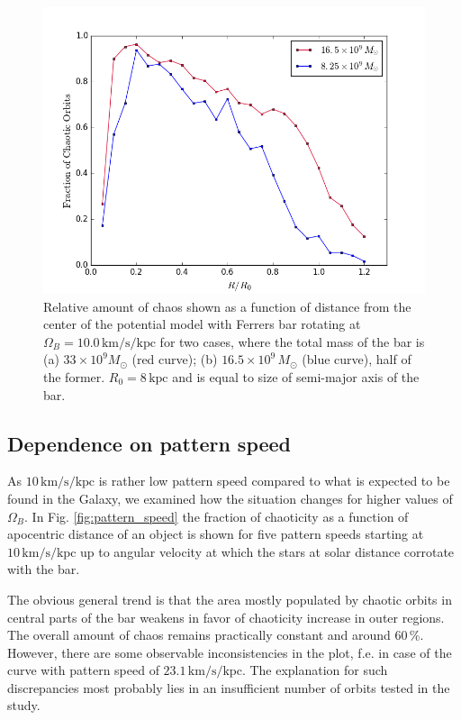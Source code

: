 \documentclass[a4paper,fleqn,usenatbib]{mnras}
\begin{document}
\begin{figure}
	\includegraphics[width=\columnwidth]{mass_dep}
	\caption{Relative amount of chaos shown as a function of distance from the center of the potential model with Ferrers bar rotating at $ \Omega_B = 10.0\,\mathrm{km/s/kpc} $ for two cases, where the total mass of the bar is (a) $ 33 \times 10^9 M_{\odot}$ (red curve); (b) $ 16.5 \times 10^9\,M_{\odot}$ (blue curve), half of the former. $ R_0 = 8\,\mathrm{kpc} $ and is equal to size of semi-major axis of the bar.}
	\label{fig:total_mass}
\end{figure}

\subsection{Dependence on pattern speed}
As $ 10\,\mathrm{km/s/kpc} $ is rather low pattern speed compared to what is expected to be found in the Galaxy, we examined how the situation changes for higher values of $ \Omega_B $. In Fig. \ref{fig:pattern_speed} the fraction of chaoticity as a function of apocentric distance of an object is shown for five pattern speeds starting at $ 10\,\mathrm{km/s/kpc} $ up to angular velocity at which the stars at solar distance corrotate with the bar.

The obvious general trend is that the area mostly populated by chaotic orbits in central parts of the bar weakens in favor of chaoticity increase in outer regions. The overall amount of chaos remains practically constant and around 60\,\%. However, there are some observable inconsistencies in the plot, f.e. in case of the curve with pattern speed of $ 23.1\,\mathrm{km/s/kpc} $. The explanation for such discrepancies most probably lies in an insufficient number of orbits tested in the study.
 
\end{document}
